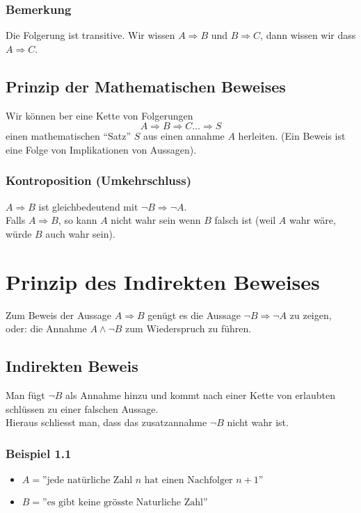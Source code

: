 \subsubsection*{Bemerkung}
Die Folgerung ist transitive. Wir wissen $A\Rightarrow B$ und $B\Rightarrow C$, dann wissen wir dass $A\Rightarrow C$.

\subsection*{Prinzip der Mathematischen Beweises}
Wir können ber eine Kette von Folgerungen \[A\Rightarrow B \Rightarrow C \dots \Rightarrow S\]
einen mathematischen ``Satz'' $S$ aus einen annahme $A$ herleiten. (Ein Beweis ist eine Folge von Implikationen von Aussagen). 
\subsubsection*{Kontroposition (Umkehrschluss)}
$A\Rightarrow B$ ist gleichbedeutend mit $\lnot B\Rightarrow\lnot A$.\\
Falls $A\Rightarrow B$, so kann $A$ nicht wahr sein wenn $B$ falsch ist (weil $A$ wahr wäre, würde $B$ auch wahr sein).

\section{Prinzip des Indirekten Beweises}
Zum Beweis der Aussage $A\Rightarrow B$ genügt es die Aussage $\lnot B\Rightarrow\lnot A$ zu zeigen, oder: die Annahme $A\land\lnot B$ zum Wiederspruch zu führen.

\subsection*{Indirekten Beweis}
Man fügt $\lnot B$ als Annahme hinzu und kommt nach einer Kette von erlaubten schlüssen zu einer falschen Aussage.\\

\noindent Hieraus schliesst man, dass das zusatzannahme $\lnot B$ nicht wahr ist. 

\subsubsection*{Beispiel 1.1}
\begin{itemize}
\item $A=\text{''jede natürliche Zahl } n \text{ hat einen Nachfolger } n+1\text{''}$
\item $B=\text{''es gibt keine grösste Naturliche Zahl''}$
\end{itemize}

